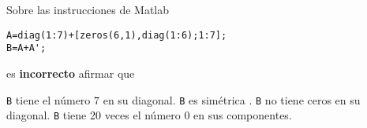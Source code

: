 \begin{pregunta}
\puntaje{}
\begin{cuerpo}
 
Sobre las instrucciones de Matlab

\begin{lstlisting}
A=diag(1:7)+[zeros(6,1),diag(1:6);1:7];
B=A+A';
\end{lstlisting}
es {\bf incorrecto} afirmar que
\end{cuerpo}
\begin{alternativas}
 {\texttt{B} tiene el n\'umero $7$ en su diagonal.}
{\texttt{B} es sim\'etrica .}
{\texttt{B} no tiene ceros en su diagonal.}
{\texttt{B} tiene 20 veces el n\'umero $0$ en sus componentes.}
\end{alternativas}
\justificacion{0cm}
\end{pregunta}